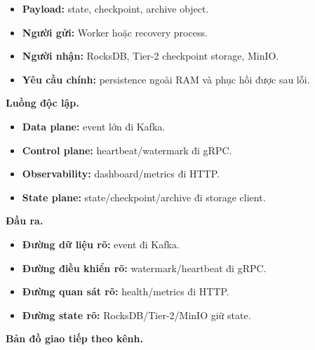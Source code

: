 \documentclass[12pt,a4paper]{article}
\begin{document}
\begin{itemize}
\item \textbf{Payload:} state, checkpoint, archive object.
\item \textbf{Người gửi:} Worker hoặc recovery process.
\item \textbf{Người nhận:} RocksDB, Tier-2 checkpoint storage, MinIO.
\item \textbf{Yêu cầu chính:} persistence ngoài RAM và phục hồi được sau lỗi.
\end{itemize}
\textbf{Luồng độc lập.}

\begin{itemize}
\item \textbf{Data plane:} event lớn đi Kafka.
\item \textbf{Control plane:} heartbeat/watermark đi gRPC.
\item \textbf{Observability:} dashboard/metrics đi HTTP.
\item \textbf{State plane:} state/checkpoint/archive đi storage client.
\end{itemize}
\textbf{Đầu ra.}

\begin{itemize}
\item \textbf{Đường dữ liệu rõ:} event đi Kafka.
\item \textbf{Đường điều khiển rõ:} watermark/heartbeat đi gRPC.
\item \textbf{Đường quan sát rõ:} health/metrics đi HTTP.
\item \textbf{Đường state rõ:} RocksDB/Tier-2/MinIO giữ state.
\end{itemize}
\textbf{Bản đồ giao tiếp theo kênh.}
\end{document}
